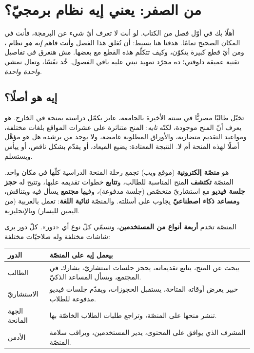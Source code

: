\section{من الصفر: يعني إيه نظام برمجيّ؟}

أهلًا بك في أوّل فصل من الكتاب. لو أنت لا تعرف أيّ شيء عن البرمجة، فأنت في المكان
الصحيح تمامًا. هدفنا هنا بسيط: أن تُغلق هذا الفصل وأنت فاهم \emph{إيه هو} نظام
، ومن أيّ قطع كبيرة يتكوّن، وكيف تتكلّم هذه القطع مع بعضها. مش هنغرق
في تفاصيل تقنية عميقة دلوقتي؛ ده مجرّد تمهيد نبني عليه باقي الفصول. خُد نفَسًا، وتعال
نمشي \emph{واحدة واحدة}.

\subsection{إيه هو  أصلًا؟}

تخيّل طالبًا مصريًّا في سنته الأخيرة بالجامعة، عايز يكمّل دراسته بمنحة في الخارج. هو
يعرف أنّ المنح موجودة، لكنّه \emph{تايه}: المنح متناثرة على عشرات المواقع بلغات
مختلفة، ومواعيد التقديم متضاربة، والأوراق المطلوبة غامضة، ولا يوجد من يرشده هل هو
مؤهَّل أصلًا لهذه المنحة أم لا. النتيجة المعتادة: يضيع الميعاد، أو يقدّم بشكل ناقص،
أو ييأس ويستسلم.

\begin{idea}
 هو \textbf{منصّة إلكترونية} (موقع ويب) تجمع رحلة المنحة الدراسية
كلّها في مكان واحد. المنصّة \textbf{تكتشف} المنح المناسبة للطالب، و\textbf{تتابع} خطوات
تقديمه عليها، وتتيح له \textbf{حجز جلسة فيديو} مع استشاريّ متخصّص (جلسة مدفوعة)، وفيها
\textbf{مجتمع} يسأل فيه ويتناقش، و\textbf{مساعد ذكاء اصطناعيّ} يجاوب على أسئلته.
والمنصّة \textbf{ثنائية اللغة}: تعمل بالعربية (من اليمين لليسار) وبالإنجليزية.
\end{idea}

المنصّة تخدم \textbf{أربعة أنواع من المستخدمين}، ونسمّي كلّ نوع  أي «دور».
كلّ دور يرى شاشات مختلفة وله صلاحيّات مختلفة:

\begin{center}
\begin{tabular}{L{3.2cm} L{9cm}}
\toprule
\textbf{\color{spPrimary}الدور} & \textbf{\color{spPrimary}بيعمل إيه على المنصّة} \\
\midrule
الطالب  & يبحث عن المنح، يتابع تقديماته، يحجز جلسات استشاريّ، يشارك في المجتمع، ويسأل المساعد الذكيّ. \\
الاستشاريّ  & خبير يعرض أوقاته المتاحة، يستقبل الحجوزات، ويقدّم جلسات فيديو مدفوعة للطلاب. \\
الجهة المانحة  & تنشر منحها على المنصّة، وتراجع طلبات الطلاب الخاصّة بها. \\
الأدمن  & المشرف الذي يوافق على المحتوى، يدير المستخدمين، ويراقب سلامة المنصّة. \\
\bottomrule
\end{tabular}
\end{center}

